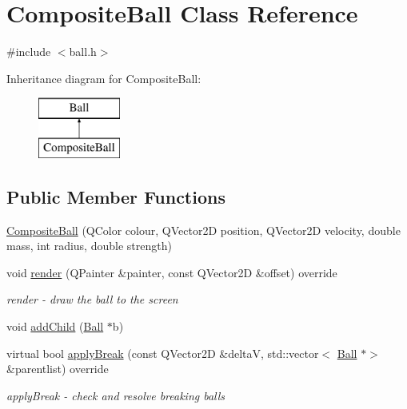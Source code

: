 \hypertarget{class_composite_ball}{}\section{Composite\+Ball Class Reference}
\label{class_composite_ball}


{\ttfamily \#include $<$ball.\+h$>$}

Inheritance diagram for Composite\+Ball\+:\begin{figure}[H]
\begin{center}
\leavevmode
\includegraphics[height=2.000000cm]{class_composite_ball}
\end{center}
\end{figure}
\subsection*{Public Member Functions}
\begin{DoxyCompactItemize}
\item 
\mbox{\hyperlink{class_composite_ball_a7b6224c07ad69240377555508ddc8876}{Composite\+Ball}} (Q\+Color colour, Q\+Vector2D position, Q\+Vector2D velocity, double mass, int radius, double strength)
\item 
void \mbox{\hyperlink{class_composite_ball_a2aefe32771e1cde5dc8f51d779c880eb}{render}} (Q\+Painter \&painter, const Q\+Vector2D \&offset) override
\begin{DoxyCompactList}\small\item\em render -\/ draw the ball to the screen \end{DoxyCompactList}\item 
void \mbox{\hyperlink{class_composite_ball_a6c226ee364012b0c3eb3271a01307297}{add\+Child}} (\mbox{\hyperlink{class_ball}{Ball}} $\ast$b)
\item 
virtual bool \mbox{\hyperlink{class_composite_ball_a0da2c5749caafcef943f14a500a0fc9b}{apply\+Break}} (const Q\+Vector2D \&deltaV, std\+::vector$<$ \mbox{\hyperlink{class_ball}{Ball}} $\ast$$>$ \&parentlist) override
\begin{DoxyCompactList}\small\item\em apply\+Break -\/ check and resolve breaking balls \end{DoxyCompactList}\end{DoxyCompactItemize}
